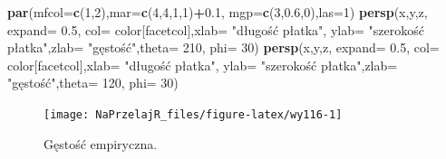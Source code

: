 \documentclass[polish,]{book}
\newenvironment{Shaded}{\begin{snugshade}}{\end{snugshade}}
\newcommand{\DataTypeTok}[1]{\textcolor[rgb]{0.13,0.29,0.53}{#1}}
\newcommand{\DecValTok}[1]{\textcolor[rgb]{0.00,0.00,0.81}{#1}}
\newcommand{\FloatTok}[1]{\textcolor[rgb]{0.00,0.00,0.81}{#1}}
\newcommand{\KeywordTok}[1]{\textcolor[rgb]{0.13,0.29,0.53}{\textbf{#1}}}
\newcommand{\NormalTok}[1]{#1}
\newcommand{\OperatorTok}[1]{\textcolor[rgb]{0.81,0.36,0.00}{\textbf{#1}}}
\newcommand{\StringTok}[1]{\textcolor[rgb]{0.31,0.60,0.02}{#1}}
\begin{document}
\begin{Shaded}
\begin{Highlighting}[]
\KeywordTok{par}\NormalTok{(}\DataTypeTok{mfcol=}\KeywordTok{c}\NormalTok{(}\DecValTok{1}\NormalTok{,}\DecValTok{2}\NormalTok{),}\DataTypeTok{mar=}\KeywordTok{c}\NormalTok{(}\DecValTok{4}\NormalTok{,}\DecValTok{4}\NormalTok{,}\DecValTok{1}\NormalTok{,}\DecValTok{1}\NormalTok{)}\OperatorTok{+}\FloatTok{0.1}\NormalTok{,}
    \DataTypeTok{mgp=}\KeywordTok{c}\NormalTok{(}\DecValTok{3}\NormalTok{,}\FloatTok{0.6}\NormalTok{,}\DecValTok{0}\NormalTok{),}\DataTypeTok{las=}\DecValTok{1}\NormalTok{)}
\KeywordTok{persp}\NormalTok{(x,y,z, }\DataTypeTok{expand=} \FloatTok{0.5}\NormalTok{, }\DataTypeTok{col=}\NormalTok{ color[facetcol],}\DataTypeTok{xlab=} \StringTok{"długość płatka"}\NormalTok{,}
      \DataTypeTok{ylab=} \StringTok{"szerokość płatka"}\NormalTok{,}\DataTypeTok{zlab=} \StringTok{"gęstość"}\NormalTok{,}\DataTypeTok{theta=} \DecValTok{210}\NormalTok{, }\DataTypeTok{phi=} \DecValTok{30}\NormalTok{)}
\KeywordTok{persp}\NormalTok{(x,y,z, }\DataTypeTok{expand=} \FloatTok{0.5}\NormalTok{, }\DataTypeTok{col=}\NormalTok{ color[facetcol],}\DataTypeTok{xlab=} \StringTok{"długość płatka"}\NormalTok{,}
      \DataTypeTok{ylab=} \StringTok{"szerokość płatka"}\NormalTok{,}\DataTypeTok{zlab=} \StringTok{"gęstość"}\NormalTok{,}\DataTypeTok{theta=} \DecValTok{120}\NormalTok{, }\DataTypeTok{phi=} \DecValTok{30}\NormalTok{)}
\end{Highlighting}
\end{Shaded}

\begin{figure}[h]

{\centering \texttt{[image: NaPrzelajR\_files/figure-latex/wy116-1]} 

}

\caption{Gęstość empiryczna.}\label{fig:wy116}
\end{figure}
\end{document}
